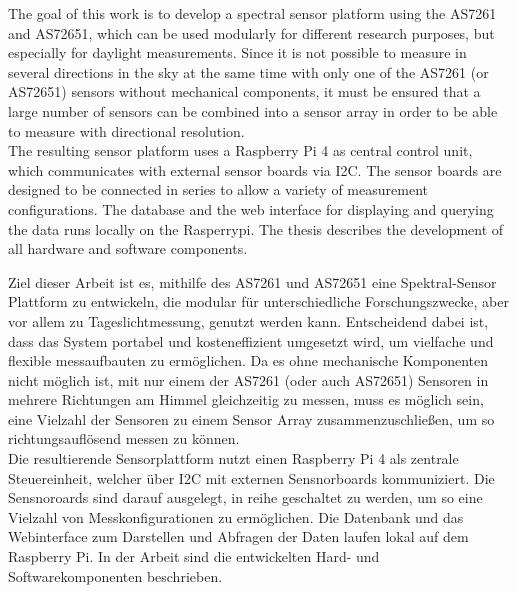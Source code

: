 The goal of this work is to develop a spectral sensor platform using the AS7261 and AS72651, which can be used modularly for different research purposes, but especially for daylight measurements. Since it is not possible to measure in several directions in the sky at the same time with only one of the AS7261 (or AS72651) sensors without mechanical components, it must be ensured that a large number of sensors can be combined into a sensor array in order to be able to measure with directional resolution.\\
The resulting sensor platform uses a Raspberry Pi 4 as central control unit, which communicates with external sensor boards via I2C.
The sensor boards are designed to be connected in series to allow a variety of measurement configurations.
The database and the web interface for displaying and querying the data runs locally on the Rasperrypi.
The thesis describes the development of all hardware and software components.\bigskip

\noindent Ziel dieser Arbeit ist es, mithilfe des AS7261 und AS72651 eine Spektral-Sensor Plattform zu entwickeln, die modular für unterschiedliche Forschungszwecke, aber vor allem zu Tageslichtmessung, genutzt werden kann. Entscheidend dabei ist, dass das System portabel und kosteneffizient umgesetzt wird, um vielfache und flexible messaufbauten zu ermöglichen. Da es ohne mechanische Komponenten nicht möglich ist, mit nur einem der AS7261 (oder auch AS72651) Sensoren in mehrere Richtungen am Himmel gleichzeitig zu messen, muss es möglich sein, eine Vielzahl der Sensoren zu einem Sensor Array zusammenzuschließen, um so richtungsauflösend messen zu können. \\
Die resultierende Sensorplattform nutzt einen Raspberry Pi 4 als zentrale Steuereinheit, welcher über I2C mit externen Sensnorboards kommuniziert.
Die Sensnoroards sind darauf ausgelegt, in reihe geschaltet zu werden, um so eine Vielzahl von Messkonfigurationen zu ermöglichen. Die Datenbank und das Webinterface zum Darstellen und Abfragen der Daten laufen lokal auf dem Raspberry Pi. In der Arbeit sind die entwickelten Hard- und Softwarekomponenten beschrieben.
